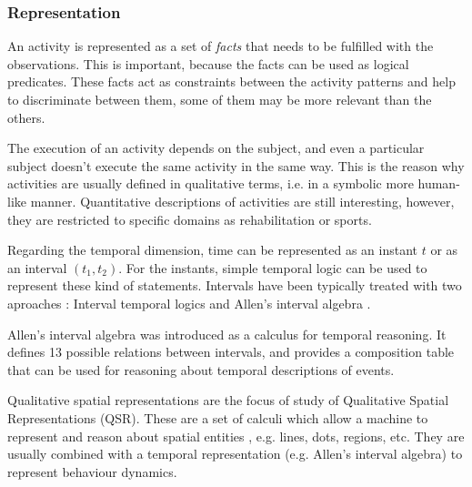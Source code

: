 \subsubsection{Representation}

An activity is represented as a set of \textit{facts} that needs to be fulfilled with the observations.
This is important, because the facts can be used as logical predicates.
These facts act as constraints between the activity patterns and help to discriminate between them, some of them may be more relevant than the others.

The execution of an activity depends on the subject, and even a particular subject doesn't execute the same activity in the same way.
This is the reason why activities are usually defined in qualitative terms, i.e. in a symbolic more human-like manner.
Quantitative descriptions of activities are still interesting, however, they are restricted to specific domains as rehabilitation or sports.

Regarding the temporal dimension, time can be represented as an instant $t$ or as an interval $(t_1,t_2)$. 
For the instants, simple temporal logic can be used to represent these kind of statements. 
Intervals have been typically treated with two aproaches \citep{Fisher2008_TempRepReas}: Interval temporal logics \citep{Moszkowski1983_RDC} and Allen's interval algebra \citep{Allen83_MaintainingKnowledgeTemporal}.


Allen's interval algebra was introduced as a calculus for temporal reasoning.
It defines 13 possible relations between intervals, and provides a composition table that can be used for reasoning about temporal descriptions of events.

Qualitative spatial representations are the focus of study of Qualitative Spatial Representations (QSR).
These are a set of calculi which allow a machine to represent and reason about spatial entities \citep{Cohn2008_QSRR}, e.g. lines, dots, regions, etc.
They are usually combined with a temporal representation (e.g. Allen's interval algebra) to represent behaviour dynamics.

